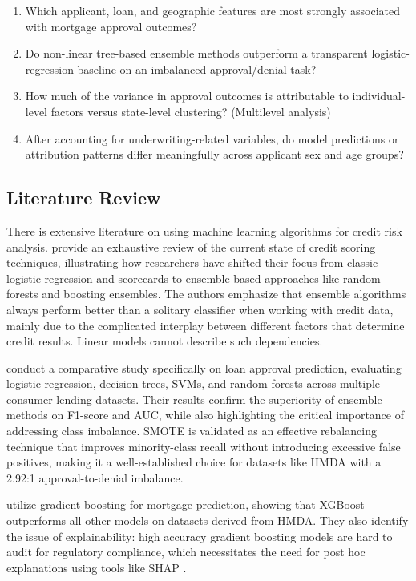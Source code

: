 \documentclass[12pt,letterpaper]{article}
\begin{document}
\begin{enumerate}[label=\textbf{RQ\arabic*.}]
  \item Which applicant, loan, and geographic features are most strongly associated with mortgage
        approval outcomes?
  \item Do non-linear tree-based ensemble methods outperform a transparent logistic-regression
        baseline on an imbalanced approval/denial task?
  \item How much of the variance in approval outcomes is attributable to individual-level
        factors versus state-level clustering? (Multilevel analysis)
  \item After accounting for underwriting-related variables, do model predictions or attribution
        patterns differ meaningfully across applicant sex and age groups?
\end{enumerate}

\subsection{Literature Review}

There is extensive literature on using machine learning algorithms for credit risk analysis.
\citet{markov2022} provide an exhaustive review of the current state of credit scoring techniques,
illustrating how researchers have shifted their focus from classic logistic regression and
scorecards to ensemble-based approaches like random forests and boosting ensembles. The authors emphasize that
ensemble algorithms always perform better than a solitary classifier when working with credit data,
mainly due to the complicated interplay between different factors that determine credit results.
Linear models cannot describe such dependencies.

\citet{kandula2024} conduct a comparative study specifically on loan approval prediction,
evaluating logistic regression, decision trees, SVMs, and random forests across multiple consumer
lending datasets. Their results confirm the superiority of ensemble methods on F1-score and AUC,
while also highlighting the critical importance of addressing class imbalance.
SMOTE \citep{chawla2002} is validated as an effective rebalancing technique that improves
minority-class recall without introducing excessive false positives, making it a well-established
choice for datasets like HMDA with a 2.92:1 approval-to-denial imbalance.

\citet{fuster2022} utilize gradient boosting for mortgage prediction, showing that
XGBoost outperforms all other models on datasets derived from HMDA. They also identify the issue
of explainability: high accuracy gradient boosting models are hard to audit for regulatory
compliance, which necessitates the need for post hoc explanations using tools like SHAP
\citep{lundberg2017}.
\end{document}
